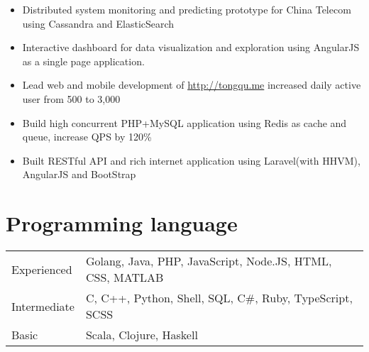 \documentclass[10pt, letterpaper]{simple-cv}
\begin{document}
\begin{itemize}
\item Distributed system monitoring and predicting prototype for China Telecom using Cassandra and ElasticSearch
\item Interactive dashboard for data visualization and exploration using AngularJS as a single page application.
\end{itemize}

\begin{itemize}
\item Lead web and mobile development of \url{http://tongqu.me} increased daily active user from 500 to 3,000
\item Build high concurrent PHP+MySQL application using Redis as cache and queue, increase QPS by 120\%
\item Built RESTful API and rich internet application using Laravel(with HHVM), AngularJS and BootStrap
\end{itemize}

\section{Programming language}
\begin{tabular}{ l l }
 Experienced &  Golang, Java, PHP, JavaScript, Node.JS, HTML, CSS, MATLAB \\
 Intermediate & C, C++, Python, Shell, SQL, C\#, Ruby, TypeScript, SCSS \\
 Basic & Scala, Clojure, Haskell
\end{tabular}
\end{document}
